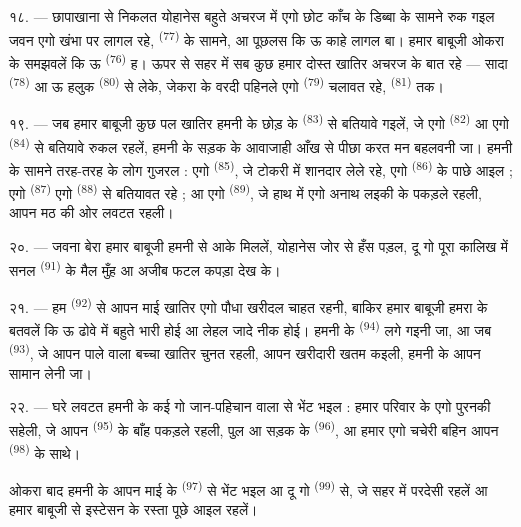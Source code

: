\VUsaut{3.0mm}

१८. --- छापाखाना से निकलत योहानेस बहुते अचरज में एगो छोट काँच के
डिब्बा के सामने रुक गइल जवन एगो खंभा पर लागल रहे,  \textsuperscript{(77)} के सामने, आ पूछलस कि ऊ काहे लागल बा।
हमार बाबूजी ओकरा के समझवलें कि ऊ 
\textsuperscript{(76)} ह। ऊपर से सहर में सब कुछ हमार दोस्त खातिर अचरज के
बात रहे — सादा  \textsuperscript{(78)} आ ऊ हलुक
 \textsuperscript{(80)} से लेके, जेकरा के वरदी
पहिनले एगो  \textsuperscript{(79)} चलावत रहे,
 \textsuperscript{(81)} तक।

१९. --- जब हमार बाबूजी कुछ पल खातिर हमनी के छोड़ के  \textsuperscript{(83)} से बतियावे गइलें, जे एगो 
\textsuperscript{(82)} आ एगो  \textsuperscript{(84)} से बतियावे
रुकल रहलें, हमनी के सड़क के आवाजाही आँख से पीछा करत मन बहलवनी जा।
हमनी के सामने तरह-तरह के लोग गुजरल : एगो 
\textsuperscript{(85)}, जे टोकरी में शानदार  लेले रहे,
एगो  \textsuperscript{(86)} के पाछे आइल ; एगो
 \textsuperscript{(87)} एगो 
\textsuperscript{(88)} से बतियावत रहे ; आ एगो 
\textsuperscript{(89)}, जे हाथ में एगो अनाथ लइकी के पकड़ले रहली, आपन मठ
की ओर लवटत रहली।

\VUsaut{3.0mm}

२०. --- जवना बेरा हमार बाबूजी हमनी से आके मिललें, योहानेस जोर से हँस
पड़ल, दू गो पूरा कालिख में सनल 
\textsuperscript{(91)} के मैल मुँह आ अजीब फटल कपड़ा देख के।

२१. --- हम  \textsuperscript{(92)} से आपन माई खातिर
एगो पौधा खरीदल चाहत रहनी, बाकिर हमार बाबूजी हमरा के बतवलें कि ऊ ढोवे
में बहुते भारी होई आ  लेहल जादे नीक होई। हमनी के
 \textsuperscript{(94)} लगे गइनी जा, आ जब
 \textsuperscript{(93)}, जे आपन पाले वाला बच्चा खातिर चुनत
रहली, आपन खरीदारी खतम कइली, हमनी के आपन सामान लेनी जा।

२२. --- घरे लवटत हमनी के कई गो जान-पहिचान वाला से भेंट भइल : हमार
परिवार के एगो पुरनकी सहेली, जे आपन 
\textsuperscript{(95)} के बाँह पकड़ले रहली, पुल आ सड़क के
 \textsuperscript{(96)}, आ हमार एगो चचेरी बहिन आपन
 \textsuperscript{(98)} के साथे।

ओकरा बाद हमनी के आपन माई के  \textsuperscript{(97)}
से भेंट भइल आ दू गो  \textsuperscript{(99)} से, जे सहर में
परदेसी रहलें आ हमार बाबूजी से इस्टेसन के रस्ता पूछे आइल रहलें।
